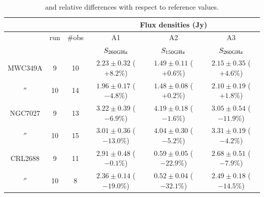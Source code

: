 \begin{table}[th]
\begin{center}
\begin{tabular}{|c|c|c|c|c|c|}
\hline
\multicolumn{3}{|c}{}  & \multicolumn{3}{|c|}{Flux densities (Jy)}   \\
\hline
         & run  & \#obs &  A1                    &  A2                   &    A3                    \\
         &      &      &  $S_{260 {\rm GHz}}$     &  $S_{150 {\rm GHz}}$  & $S_{260 {\rm GHz}}$    \\
\hline\hline
MWC349A   &  9   & 10  &  $2.23\pm0.32$  ($+8.2\%$)  &  $1.49\pm0.11$ ($+0.6\%$) &  $2.15\pm0.35$ ($+4.6\%$)      \\
  $''$   & 10   & 14  &  $1.96\pm0.17$  ($-4.8\%$)  &  $1.48\pm0.08$ ($+0.2\%$) &  $2.10\pm0.19$ ($+1.8\%$)                  \\ 
  \hline
NGC7027  &  9   & 13  &  $3.22\pm0.39$  ($-6.9\%$)  &  $4.19\pm0.18$ ($-1.6\%$) & $3.05\pm0.54$  ($-11.9\%$)      \\
  $''$   & 10   & 15  &  $3.01\pm0.36$  ($-13.0\%$) &  $4.04\pm0.30$ ($-5.2\%$) & $3.31\pm0.19$  ($-4.2\%$)                   \\ 
  \hline
CRL2688  &  9   & 11  &  $2.91\pm0.48$  ($-0.1\%$)  &  $0.59\pm0.05$ ($-22.9\%$)  &  $2.68\pm0.51$ ($-7.9\%$)     \\
  $''$   & 10   &  8  &  $2.36\pm0.14$  ($-19.0\%$) &  $0.52\pm0.04$ ($-32.1\%$)  &  $2.49\pm0.18$ ($-14.5\%$)                   \\
\hline
\end{tabular}
\caption[Flux densities from aperture photometry]{ and relative differences with respect to reference values.}
\label{tab:flux_sec_Ap}
\end{center}
\end{table}

